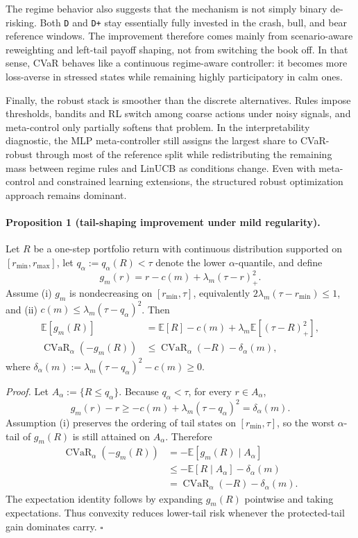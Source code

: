 \documentclass[10pt,twocolumn]{article}
\begin{document}
The regime behavior also suggests that the mechanism is not simply binary
de-risking. Both \texttt{D} and \texttt{D+} stay essentially fully invested in
the crash, bull, and bear reference windows. The improvement therefore comes
mainly from scenario-aware reweighting and left-tail payoff shaping, not from
switching the book off. In that sense, CVaR behaves like a continuous
regime-aware controller: it becomes more loss-averse in stressed states while
remaining highly participatory in calm ones.

Finally, the robust stack is smoother than the discrete alternatives. Rules
impose thresholds, bandits and RL switch among coarse actions under noisy
signals, and meta-control only partially softens that problem. In the
interpretability diagnostic, the MLP meta-controller still assigns the largest
share to CVaR-robust through most of the reference split while redistributing
the remaining mass between regime rules and LinUCB as conditions change. Even
with meta-control and constrained learning extensions, the structured robust
optimization approach remains dominant.

\paragraph{Proposition 1 (tail-shaping improvement under mild regularity).}
Let $R$ be a one-step portfolio return with continuous distribution supported on
$[r_{\min}, r_{\max}]$, let $q_\alpha:=q_\alpha(R)<\tau$ denote the lower
$\alpha$-quantile, and define
\[
g_m(r)=r-c(m)+\lambda_m(\tau-r)_+^2.
\]
Assume (i) $g_m$ is nondecreasing on $[r_{\min},\tau]$, equivalently
$2\lambda_m(\tau-r_{\min})\le 1$, and (ii)
$c(m)\le \lambda_m(\tau-q_\alpha)^2$. Then
\begin{align*}
\mathbb{E}[g_m(R)]
&=\mathbb{E}[R]-c(m)+\lambda_m \mathbb{E}\!\left[(\tau-R)_+^2\right], \\
\operatorname{CVaR}_\alpha(-g_m(R))
&\le \operatorname{CVaR}_\alpha(-R)-\delta_\alpha(m),
\end{align*}
where $\delta_\alpha(m):=\lambda_m(\tau-q_\alpha)^2-c(m)\ge 0$.

\emph{Proof.} Let $A_\alpha:=\{R\le q_\alpha\}$. Because $q_\alpha<\tau$, for
every $r\in A_\alpha$,
\[
g_m(r)-r \ge -c(m)+\lambda_m(\tau-q_\alpha)^2 = \delta_\alpha(m).
\]
Assumption (i) preserves the ordering of tail states on $[r_{\min},\tau]$, so
the worst $\alpha$-tail of $g_m(R)$ is still attained on $A_\alpha$. Therefore
\begin{align*}
\operatorname{CVaR}_\alpha(-g_m(R))
&= -\mathbb{E}[g_m(R)\mid A_\alpha] \\
&\le -\mathbb{E}[R\mid A_\alpha]-\delta_\alpha(m) \\
&= \operatorname{CVaR}_\alpha(-R)-\delta_\alpha(m).
\end{align*}
The expectation identity follows by expanding $g_m(R)$ pointwise and taking
expectations. Thus convexity reduces lower-tail risk whenever the protected-tail
gain dominates carry. \hfill $\square$
\end{document}
